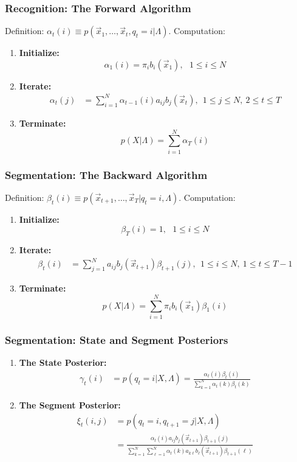 \documentclass{beamer}
\begin{document}
\begin{frame}
  \frametitle{Recognition: The Forward Algorithm}

  Definition: $\alpha_t(i) \equiv p(\vec{x}_1,\ldots,\vec{x}_t,q_t=i|\Lambda)$.  Computation:
  \begin{enumerate}
  \item {\bf Initialize:}
    \[
    \alpha_1(i) = \pi_i b_i(\vec{x}_1),~~~1\le i\le N
    \]
  \item {\bf Iterate:}
    \begin{align*}
      \alpha_{t}(j) &= \sum_{i=1}^N \alpha_{t-1}(i) a_{ij}b_j(\vec{x}_t),~~1\le j\le N,~2\le t\le T
    \end{align*}
  \item {\bf Terminate:}
    \[
    p(X|\Lambda) = \sum_{i=1}^N \alpha_T(i)
    \]
  \end{enumerate}
\end{frame}
  
\begin{frame}
  \frametitle{Segmentation: The Backward Algorithm}

  Definition: $\beta_t(i) \equiv p(\vec{x}_{t+1},\ldots,\vec{x}_T|q_t=i,\Lambda)$.  Computation:
  \begin{enumerate}
  \item {\bf Initialize:}
    \[
    \beta_T(i) = 1,~~~1\le i\le N
    \]
  \item {\bf Iterate:}
    \begin{align*}
      \beta_{t}(i) &= \sum_{j=1}^N a_{ij}b_j(\vec{x}_{t+1})\beta_{t+1}(j),~~1\le i\le N,~1\le t\le T-1
    \end{align*}
  \item {\bf Terminate:}
    \[
    p(X|\Lambda) = \sum_{i=1}^N \pi_ib_i(\vec{x}_1)\beta_1(i)
    \]
  \end{enumerate}
\end{frame}

\begin{frame}
  \frametitle{Segmentation: State and Segment Posteriors}

  \begin{enumerate}
  \item {\bf The State Posterior:}
    \begin{align*}
      \gamma_t(i) & = p(q_t=i|X,\Lambda)
      = \frac{\alpha_t(i)\beta_t(i)}{\sum_{k=1}^N\alpha_t(k)\beta_t(k)}
    \end{align*}
  \item {\bf The Segment Posterior:}
    \begin{align*}
      \xi_t(i,j) & = p(q_t=i,q_{t+1}=j|X,\Lambda)\\
      &= \frac{\alpha_t(i)a_{ij}b_j(\vec{x}_{t+1})\beta_{t+1}(j)}{\sum_{k=1}^N\sum_{\ell=1}^N\alpha_t(k)a_{k\ell}b_\ell(\vec{x}_{t+1})\beta_{t+1}(\ell)}
    \end{align*}
  \end{enumerate}
\end{frame}
\end{document}
